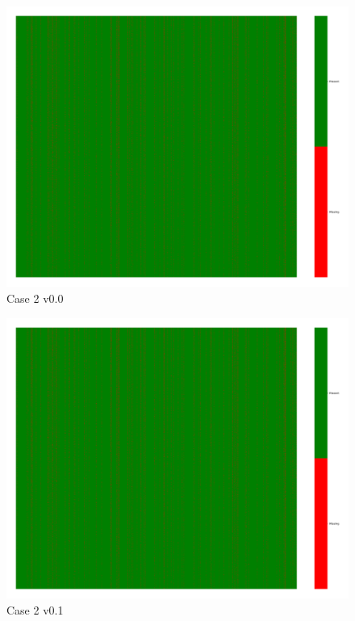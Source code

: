 \documentclass[a4paper,12pt]{article}
\begin{document}
\begin{figure}[H]
    \includegraphics[width=\linewidth]{case2_v0.0_heatmap_cleaned.png}
    \caption*{Case 2 v0.0}
\end{figure}

\begin{figure}[H]
    \includegraphics[width=\linewidth]{case2_v0.1_heatmap_cleaned.png}
    \caption*{Case 2 v0.1}
\end{figure}
\end{document}
